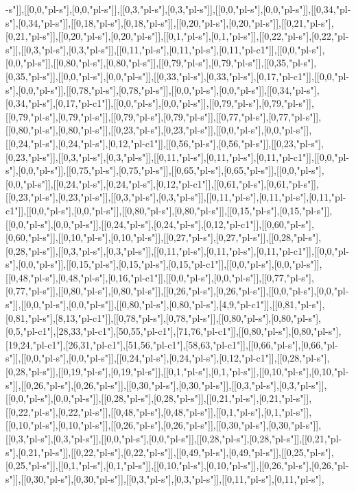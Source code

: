 -s"]],[[0,0,"pl-s"],[0,0,"pl-s"]],[[0,3,"pl-s"],[0,3,"pl-s"]],[[0,0,"pl-s"],[0,0,"pl-s"]],[[0,34,"pl-s"],[0,34,"pl-s"]],[[0,18,"pl-s"],[0,18,"pl-s"]],[[0,20,"pl-s"],[0,20,"pl-s"]],[[0,21,"pl-s"],[0,21,"pl-s"]],[[0,20,"pl-s"],[0,20,"pl-s"]],[[0,1,"pl-s"],[0,1,"pl-s"]],[[0,22,"pl-s"],[0,22,"pl-s"]],[[0,3,"pl-s"],[0,3,"pl-s"]],[[0,11,"pl-s"],[0,11,"pl-s"],[0,11,"pl-c1"]],[[0,0,"pl-s"],[0,0,"pl-s"]],[[0,80,"pl-s"],[0,80,"pl-s"]],[[0,79,"pl-s"],[0,79,"pl-s"]],[[0,35,"pl-s"],[0,35,"pl-s"]],[[0,0,"pl-s"],[0,0,"pl-s"]],[[0,33,"pl-s"],[0,33,"pl-s"],[0,17,"pl-c1"]],[[0,0,"pl-s"],[0,0,"pl-s"]],[[0,78,"pl-s"],[0,78,"pl-s"]],[[0,0,"pl-s"],[0,0,"pl-s"]],[[0,34,"pl-s"],[0,34,"pl-s"],[0,17,"pl-c1"]],[[0,0,"pl-s"],[0,0,"pl-s"]],[[0,79,"pl-s"],[0,79,"pl-s"]],[[0,79,"pl-s"],[0,79,"pl-s"]],[[0,79,"pl-s"],[0,79,"pl-s"]],[[0,77,"pl-s"],[0,77,"pl-s"]],[[0,80,"pl-s"],[0,80,"pl-s"]],[[0,23,"pl-s"],[0,23,"pl-s"]],[[0,0,"pl-s"],[0,0,"pl-s"]],[[0,24,"pl-s"],[0,24,"pl-s"],[0,12,"pl-c1"]],[[0,56,"pl-s"],[0,56,"pl-s"]],[[0,23,"pl-s"],[0,23,"pl-s"]],[[0,3,"pl-s"],[0,3,"pl-s"]],[[0,11,"pl-s"],[0,11,"pl-s"],[0,11,"pl-c1"]],[[0,0,"pl-s"],[0,0,"pl-s"]],[[0,75,"pl-s"],[0,75,"pl-s"]],[[0,65,"pl-s"],[0,65,"pl-s"]],[[0,0,"pl-s"],[0,0,"pl-s"]],[[0,24,"pl-s"],[0,24,"pl-s"],[0,12,"pl-c1"]],[[0,61,"pl-s"],[0,61,"pl-s"]],[[0,23,"pl-s"],[0,23,"pl-s"]],[[0,3,"pl-s"],[0,3,"pl-s"]],[[0,11,"pl-s"],[0,11,"pl-s"],[0,11,"pl-c1"]],[[0,0,"pl-s"],[0,0,"pl-s"]],[[0,80,"pl-s"],[0,80,"pl-s"]],[[0,15,"pl-s"],[0,15,"pl-s"]],[[0,0,"pl-s"],[0,0,"pl-s"]],[[0,24,"pl-s"],[0,24,"pl-s"],[0,12,"pl-c1"]],[[0,60,"pl-s"],[0,60,"pl-s"]],[[0,10,"pl-s"],[0,10,"pl-s"]],[[0,27,"pl-s"],[0,27,"pl-s"]],[[0,28,"pl-s"],[0,28,"pl-s"]],[[0,3,"pl-s"],[0,3,"pl-s"]],[[0,11,"pl-s"],[0,11,"pl-s"],[0,11,"pl-c1"]],[[0,0,"pl-s"],[0,0,"pl-s"]],[[0,15,"pl-s"],[0,15,"pl-s"],[0,15,"pl-c1"]],[[0,0,"pl-s"],[0,0,"pl-s"]],[[0,48,"pl-s"],[0,48,"pl-s"],[0,16,"pl-c1"]],[[0,0,"pl-s"],[0,0,"pl-s"]],[[0,77,"pl-s"],[0,77,"pl-s"]],[[0,80,"pl-s"],[0,80,"pl-s"]],[[0,26,"pl-s"],[0,26,"pl-s"]],[[0,0,"pl-s"],[0,0,"pl-s"]],[[0,0,"pl-s"],[0,0,"pl-s"]],[[0,80,"pl-s"],[0,80,"pl-s"],[4,9,"pl-c1"]],[[0,81,"pl-s"],[0,81,"pl-s"],[8,13,"pl-c1"]],[[0,78,"pl-s"],[0,78,"pl-s"]],[[0,80,"pl-s"],[0,80,"pl-s"],[0,5,"pl-c1"],[28,33,"pl-c1"],[50,55,"pl-c1"],[71,76,"pl-c1"]],[[0,80,"pl-s"],[0,80,"pl-s"],[19,24,"pl-c1"],[26,31,"pl-c1"],[51,56,"pl-c1"],[58,63,"pl-c1"]],[[0,66,"pl-s"],[0,66,"pl-s"]],[[0,0,"pl-s"],[0,0,"pl-s"]],[[0,24,"pl-s"],[0,24,"pl-s"],[0,12,"pl-c1"]],[[0,28,"pl-s"],[0,28,"pl-s"]],[[0,19,"pl-s"],[0,19,"pl-s"]],[[0,1,"pl-s"],[0,1,"pl-s"]],[[0,10,"pl-s"],[0,10,"pl-s"]],[[0,26,"pl-s"],[0,26,"pl-s"]],[[0,30,"pl-s"],[0,30,"pl-s"]],[[0,3,"pl-s"],[0,3,"pl-s"]],[[0,0,"pl-s"],[0,0,"pl-s"]],[[0,28,"pl-s"],[0,28,"pl-s"]],[[0,21,"pl-s"],[0,21,"pl-s"]],[[0,22,"pl-s"],[0,22,"pl-s"]],[[0,48,"pl-s"],[0,48,"pl-s"]],[[0,1,"pl-s"],[0,1,"pl-s"]],[[0,10,"pl-s"],[0,10,"pl-s"]],[[0,26,"pl-s"],[0,26,"pl-s"]],[[0,30,"pl-s"],[0,30,"pl-s"]],[[0,3,"pl-s"],[0,3,"pl-s"]],[[0,0,"pl-s"],[0,0,"pl-s"]],[[0,28,"pl-s"],[0,28,"pl-s"]],[[0,21,"pl-s"],[0,21,"pl-s"]],[[0,22,"pl-s"],[0,22,"pl-s"]],[[0,49,"pl-s"],[0,49,"pl-s"]],[[0,25,"pl-s"],[0,25,"pl-s"]],[[0,1,"pl-s"],[0,1,"pl-s"]],[[0,10,"pl-s"],[0,10,"pl-s"]],[[0,26,"pl-s"],[0,26,"pl-s"]],[[0,30,"pl-s"],[0,30,"pl-s"]],[[0,3,"pl-s"],[0,3,"pl-s"]],[[0,11,"pl-s"],[0,11,"pl-s"],